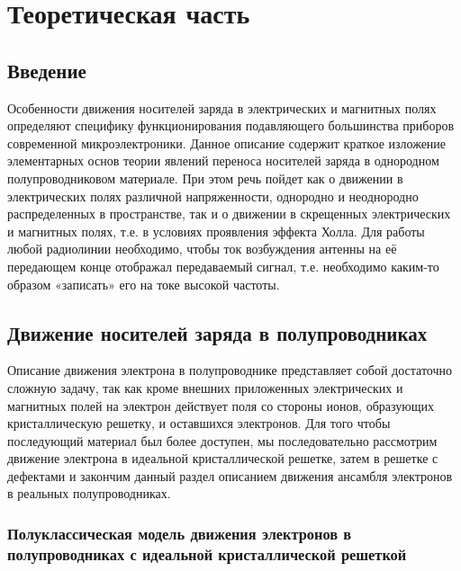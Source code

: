 
\usepackage{gensymb}
\usepackage{textcomp}
\usepackage{mathrsfs}

\def\labauthors{Карусевич А.А, Понур К.А.}
\def\labgroup{430}
\def\department{Кафедра электроники и квантовой физики}
\def\labnumber{1}
\def\labtheme{Движение носителей заряда в электрических и магнитных полях}

\renewcommand{\phi}{\varphi}

\def\E{\mathscr{E}_H}
\def\Rdim{\,\frac{\text{м}^3}{\text{А} \cdot \text{с}}}

\tableofcontents
\newpage
\section{Теоретическая часть}
\subsection*{Введение}
	Особенности движения носителей заряда в электрических и магнитных
полях определяют специфику функционирования подавляющего большинства
приборов современной микроэлектроники. Данное описание содержит краткое
изложение элементарных основ теории явлений переноса носителей заряда в 
однородном полупроводниковом материале. При этом речь пойдет как о движении
в электрических полях различной напряженности, однородно и неоднородно
распределенных в пространстве, так и о движении в скрещенных электрических
и магнитных полях, т.е. в условиях проявления эффекта Холла.
Для работы любой радиолинии необходимо, чтобы ток возбуждения антенны на её передающем конце отображал передаваемый сигнал, т.е. необходимо каким-то образом «записать» его на токе высокой частоты.



\subsection{Движение носителей заряда в полупроводниках}
Описание движения электрона в полупроводнике представляет собой достаточно сложную задачу, так как кроме внешних приложенных электрических и
магнитных полей на электрон действует поля со стороны ионов, образующих
кристаллическую решетку, и оставшихся электронов. Для того чтобы последующий материал был более доступен, мы последовательно рассмотрим движение
электрона в идеальной кристаллической решетке, затем в решетке с дефектами и
закончим данный раздел описанием движения ансамбля электронов в реальных
полупроводниках.

\subsubsection{Полуклассическая модель движения электронов в полупроводниках с идеальной кристаллической решеткой}

